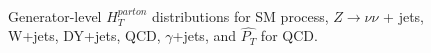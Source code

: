 \begin{figure}[!h]
\begin{center}
    \\
    \caption{Generator-level $H_{T}^{parton}$ distributions for SM process, $Z\rightarrow \nu\nu$ + jets, W+jets, DY+jets, QCD, $\gamma$+jets, and $\hat{P_{T}}$ for QCD.}
    \label{fig:Lhe_Ht}
  \end{center}
\end{figure}

